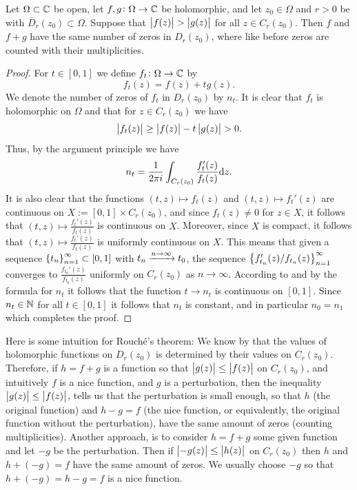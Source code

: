 \documentclass[11pt,a4paper]{article}
\begin{document}
\begin{theorem}
  \label{thm:rouche}
  Let $\Omega \subset \mathbb{C}$ be open,
  let $f,g \colon \Omega \to \mathbb{C}$ be holomorphic,
  and let $z_0 \in \Omega$ and $r > 0$ be with $\overline D_r(z_0) \subset \Omega$.
  Suppose that $\left\lvert f(z)\right\rvert > \left\lvert g(z)\right\rvert$ for all $z \in C_r(z_0)$.
  Then $f$ and $f + g$ have the same number of zeros in $D_r(z_0)$,
  where like before zeros are counted with their multiplicities.
\end{theorem}
\begin{proof}
  For $t \in [0,1]$ we define $f_t \colon \Omega \to \mathbb{C}$ by
  \[
    f_t(z) = f(z) + t g(z).
  \]
  We denote the number of zeros of $f_t$ in $D_r(z_0)$ by $n_t$.
  It is clear that $f_t$ is holomorphic on $\Omega$ and that for
  $z \in C_r(z_0)$ we have
  \[
    \left\lvert f_t(z)\right\rvert \geq
    \left\lvert f(z)\right\rvert - t \left\lvert g(z)\right\rvert > 0.
  \]
  Thus, by the argument principle we have
  \[
    n_t = \frac{1}{2 \pi i} \int_{C_r(z_0)} \frac{f_t'(z)}{f_t(z)} \mathrm{d} z.
  \]
  It is also clear that the functions $(t,z) \mapsto f_t(z)$ and
  $(t,z) \mapsto f_t'(z)$ are continuous on $X := [0,1] \times C_r(z_0)$,
  and since $f_t(z) \neq 0$ for $z \in X$, it follows that
  $(t,z) \mapsto \frac{f_t'(z)}{f_t(z)}$ is continuous on $X$.
  Moreover, since $X$ is compact, it follows that
  $(t,z) \mapsto \frac{f_t'(z)}{f_t(z)}$ is uniformly continuous on $X$.
  This means that given a sequence $\left\{t_n\right\}_{n=1}^{\infty} \subset [0,1]$
  with $t_n \xrightarrow{n \to \infty} t_0$, the sequence
  $\left\{{f_{t_n}'(z)/f_{t_n}(z)}\right\}_{n=1}^{\infty}$ converges to
  $\frac{f_{t_0}'(z)}{f_{t_0}(z)}$ uniformly on $C_r(z_0)$ as $n \to \infty$.
  According to  and by the formula for $n_t$
  it follows that the function $t \to n_t$ is continuous on $[0,1]$.
  Since $n_t \in \mathbb{N}$ for all $t \in [0,1]$ it follows that $n_t$ is constant,
  and in particular $n_0 = n_1$ which completes the proof.
\end{proof}
\begin{remark}
  Here is some intuition for Rouch\'e's theorem:
  We know by  that the values of holomorphic
  functions on $D_r(z_0)$ is determined by their values on $C_r(z_0)$.
  Therefore, if $h = f + g$ is a function so that $\left\lvert g(z)\right\rvert \le \left\lvert f(z)\right\rvert$
  on $C_r(z_0)$, and intuitively $f$ is a nice function, and $g$
  is a perturbation,
  then the inequality $\left\lvert g(z)\right\rvert \le \left\lvert f(z)\right\rvert$,
  tells us that the perturbation is small enough,
  so that $h$ (the original function) and $h - g = f$ (the nice function,
  or equivalently, the original function without the perturbation),
  have the same amount of zeros (counting multiplicities).
  Another approach, is to consider $h = f + g$ some given function
  and let $-g$ be the perturbation.
  Then if $\left\lvert-g(z)\right\rvert \le \left\lvert h(z)\right\rvert$ on $C_r(z_0)$
  then $h$ and $h + (-g) = f$ have the same amount of zeros.
  We usually choose $-g$ so that $h + (-g) = h - g = f$ is a nice function.
\end{remark}
\end{document}

